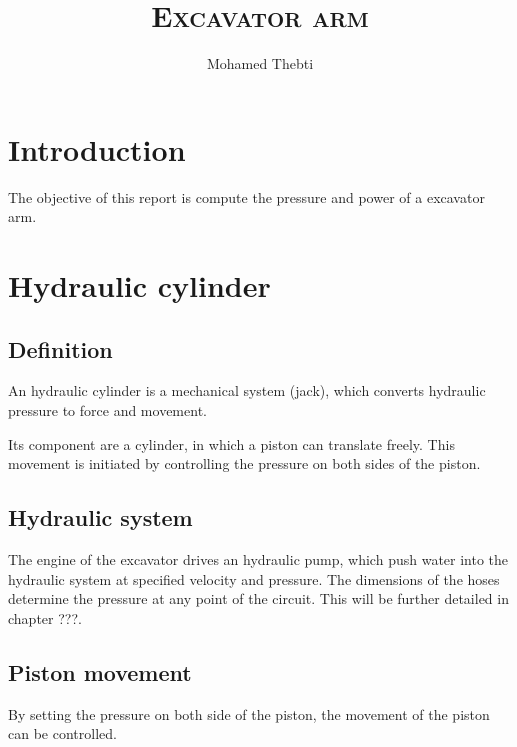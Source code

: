 \documentclass[12pt,a4paper]{article}
\title{
	\Huge\textsc{Excavator arm}
}
\author{Mohamed Thebti}
\begin{document}
\setlength{\parindent}{0mm}

\fancyhead[R]{\slshape \leftmark}

\fancyfoot[C]{}
\fancyfoot[R]{\thepage}

\maketitle
\newpage

\tableofcontents

\newpage



\section{Introduction}

The objective of this report is compute the pressure and power of a excavator arm. 


\section{Hydraulic cylinder}

\subsection{Definition}
An hydraulic cylinder is a mechanical system (jack), which converts hydraulic pressure to force and movement.

Its component are a cylinder, in which a piston can translate freely. This movement is initiated by controlling the pressure on both sides of the piston. 

\subsection{Hydraulic system}
The engine of the excavator drives an hydraulic pump, which push water into the hydraulic system at specified velocity and pressure. The dimensions of the hoses determine the pressure at any point of the circuit. This will be further detailed in chapter ???.

\subsection{Piston movement}
By setting the pressure on both side of the piston, the movement of the piston can be controlled. 
\end{document}
